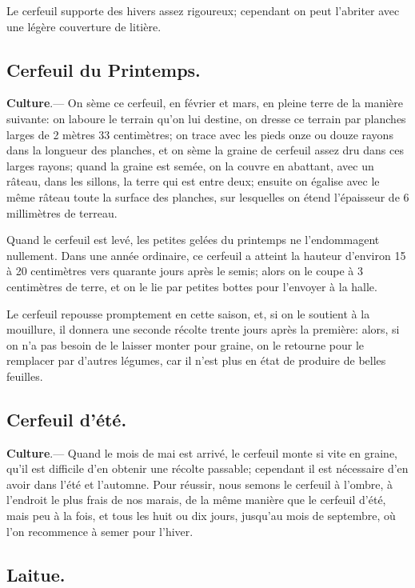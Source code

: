 \documentclass[10pt,a4paper]{book}
\begin{document}
Le cerfeuil supporte des hivers assez rigoureux; cependant on peut l'abriter avec une légère couverture de litière.

\subsection{Cerfeuil du Printemps.}

\textbf{Culture}.--- On sème ce cerfeuil, en février et mars, en pleine terre de la manière suivante: on laboure le terrain qu'on lui destine, on dresse ce terrain par planches larges de 2 mètres 33 centimètres; on trace avec les pieds onze ou douze rayons dans la longueur des planches, et on sème la graine de cerfeuil assez dru dans ces larges rayons; quand la graine est semée, on la couvre en abattant, avec un râteau, dans les sillons, la terre qui est entre deux; ensuite on égalise avec le même râteau toute la surface des planches, sur lesquelles on étend l'épaisseur de 6 millimètres de terreau.

Quand le cerfeuil est levé, les petites gelées du printemps ne l'endommagent nullement. Dans une année ordinaire, ce cerfeuil a atteint la hauteur d'environ 15 à 20 centimètres vers quarante jours après le semis; alors on le coupe à 3 centimètres de terre, et on le lie par petites bottes pour l'envoyer à la halle.

Le cerfeuil repousse promptement en cette saison, et, si on le soutient à la mouillure, il donnera une seconde récolte trente jours après la première: alors, si on n'a pas besoin de le laisser monter pour graine, on le retourne pour le remplacer par d'autres légumes, car il n'est plus en état de produire de belles feuilles.

\subsection{Cerfeuil d'été.}

\textbf{Culture}.--- Quand le mois de mai est arrivé, le cerfeuil monte si vite en graine, qu'il est difficile d'en obtenir une récolte passable; cependant il est nécessaire d'en avoir dans l'été et l'automne. Pour réussir, nous semons le cerfeuil à l'ombre, à l'endroit le plus frais de nos marais, de la même manière que le cerfeuil d'été, mais peu à la fois, et tous les huit ou dix jours, jusqu'au mois de septembre, où l'on recommence à semer pour l'hiver.

\subsection{Laitue.}
\end{document}
